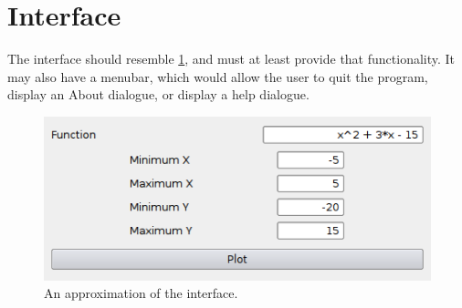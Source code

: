 \documentclass[12pt,a4paper]{article}
\begin{document}
	\section{Interface}
		The interface should resemble \ref{fig:interface1}, and must at least provide that functionality.  It may also have a menubar, which would allow the user to quit the program, display an About dialogue, or display a help dialogue.
		\begin{figure}[h]
			\label{fig:interface1}
			\centering
			    \includegraphics[width=\textwidth]{interface1.png}
			\caption{An approximation of the interface.}
		\end{figure}
\end{document}
